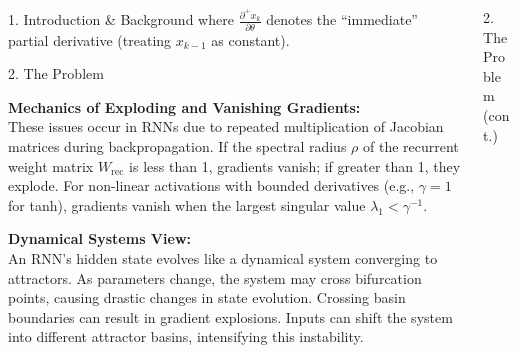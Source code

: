 \documentclass[final]{beamer}
\begin{document}
\begin{frame}[t]
\begin{columns}[t,totalwidth=\textwidth]
\begin{column}{0.3\textwidth}
\begin{block}{1. Introduction \& Background}
        \vspace{0.5em}
        where $\frac{\partial^+ x_k}{\partial \theta}$ denotes the “immediate” partial derivative (treating $x_{k-1}$ as constant).
        
        \vspace{0.5em}

      \end{block}





      \begin{block}{2. The Problem}

    \textbf{Mechanics of Exploding and Vanishing Gradients:} \\
    These issues occur in RNNs due to repeated multiplication of Jacobian matrices during backpropagation. If the spectral radius $\rho$ of the recurrent weight matrix $W_{\text{rec}}$ is less than 1, gradients vanish; if greater than 1, they explode. For non-linear activations with bounded derivatives (e.g., $\gamma=1$ for tanh), gradients vanish when the largest singular value $\lambda_1 < \gamma^{-1}$.

    \vspace{0.5em}
    \textbf{Dynamical Systems View:} \\
    An RNN's hidden state evolves like a dynamical system converging to attractors. As parameters change, the system may cross bifurcation points, causing drastic changes in state evolution. Crossing basin boundaries can result in gradient explosions. Inputs can shift the system into different attractor basins, intensifying this instability.
    \end{block}
    \end{column}

\begin{column}{0.3\textwidth}
    \begin{block}{2. The Problem (cont.)}



\end{block}
\end{column}
\end{columns}
\end{frame}
\end{document}
